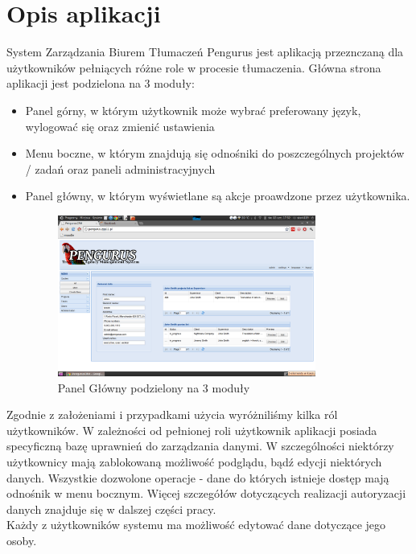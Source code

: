 \documentclass[licencjacka]{pracamgr}
\begin{document}
\section{Opis aplikacji}
System Zarządzania Biurem Tłumaczeń Pengurus jest aplikacją przeznczaną dla użytkowników pełniących różne role w procesie tłumaczenia.
Główna strona aplikacji jest podzielona na 3 moduły:
\begin{itemize}
\item Panel górny, w którym użytkownik może wybrać preferowany język, wylogować się oraz zmienić ustawienia
\item  Menu boczne, w którym znajdują się odnośniki do poszczególnych projektów / zadań oraz paneli administracyjnych
\item  Panel główny, w którym wyświetlane są akcje proawdzone przez użytkownika.  
\begin{figure}[h!]
\centering
\includegraphics[width=0.8\textwidth]{resources/panel_glowny.png}
\caption{Panel Główny podzielony na 3 moduły}
\end{figure}
\end{itemize}

Zgodnie z założeniami i przypadkami użycia wyróżniliśmy kilka ról użytkowników. W zależności od pełnionej roli użytkownik aplikacji posiada specyficzną bazę uprawnień do zarządzania danymi. W szczególności niektórzy użytkownicy mają zablokowaną możliwość podglądu, bądź edycji niektórych danych. Wszystkie dozwolone operacje - dane do których istnieje dostęp mają odnośnik w menu bocznym.
Więcej szczegółów dotyczących realizacji autoryzacji danych znajduje się w dalszej części pracy.\\

Każdy z użytkowników systemu ma możliwość edytować dane dotyczące jego osoby.\\ 
\end{document}
